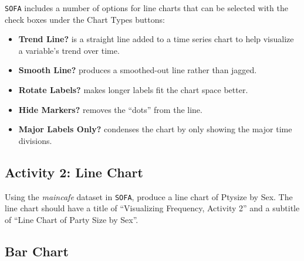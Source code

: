 \texttt{SOFA} includes a number of options for line charts that can be selected with the check boxes under the Chart Types buttons:

\begin{itemize}
  \item \textbf{Trend Line?} is a straight line added to a time series chart to help visualize a variable's trend over time.
  \item \textbf{Smooth Line?} produces a smoothed-out line rather than jagged.
  \item \textbf{Rotate Labels?} makes longer labels fit the chart space better.
  \item \textbf{Hide Markers?} removes the ``dots'' from the line.
  \item \textbf{Major Labels Only?} condenses the chart by only showing the major time divisions.
\end{itemize}

\subsection{Activity 2: Line Chart} \label{vfr:act02}

Using the \textit{maincafe} dataset in \texttt{SOFA}, produce a line chart of Ptysize by Sex. The line chart should have a title of ``Visualizing Frequency, Activity 2'' and a subtitle of ``Line Chart of Party Size by Sex''.

\subsection{Bar Chart}

